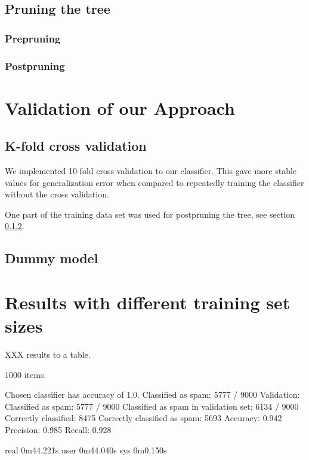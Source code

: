 \documentclass[a4paper,10pt]{article}
\begin{document}
\subsection{Pruning the tree}

\subsubsection{Prepruning}

\subsubsection{Postpruning}
\label{sect:postpruning}

\section{Validation of our Approach}

\subsection{K-fold cross validation}

We implemented 10-fold cross validation to our classifier.  This
gave more stable values for generalization error when compared to
repeatedly training the classifier without the cross validation.

One part of the training data set was used for postpruning the tree, see
section \ref{sect:postpruning}.

\subsection{Dummy model}


\section{Results with different training set sizes}

XXX results to a table.

1000 items.

\begin{outputlog}
Chosen classifier has accuracy of 1.0.
Classified as spam: 5777 / 9000
Validation:
 Classified as spam: 5777 / 9000
 Classified as spam in validation set: 6134 / 9000
 Correctly classified: 8475
 Correctly classified as spam: 5693
 Accuracy: 0.942
 Precision: 0.985
 Recall: 0.928

real	0m44.221s
user	0m44.040s
sys	0m0.150s
\end{outputlog}
\end{document}
